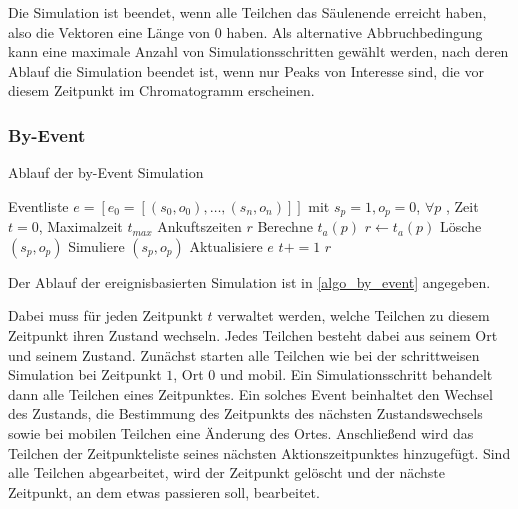 Die Simulation ist beendet, wenn alle Teilchen das Säulenende erreicht haben, also die Vektoren eine Länge von $0$ haben. 
Als alternative Abbruchbedingung kann eine maximale Anzahl von Simulationsschritten gewählt werden, nach deren Ablauf die Simulation beendet ist, wenn nur Peaks von Interesse sind, die vor diesem Zeitpunkt im Chromatogramm erscheinen.



\subsubsection{By-Event}

\begin{algorithm}
\caption{Ablauf der by-Event Simulation}
\label{algo_by_event}
\begin{algorithmic}
\REQUIRE Eventliste $e= [e_0 = [(s_0, o_0), \ldots, (s_n, o_n)]]$ mit $s_p = 1, o_p = 0$, $\forall p$ , Zeit $t=0$, Maximalzeit $t_{max}$
\ENSURE Ankuftszeiten $r$
\STATE Berechne $t_a(p)$ 
\STATE $r \leftarrow t_a(p)$
\STATE Lösche $(s_p, o_p)$
\ENDIF
\STATE Simuliere $(s_p, o_p)$
\STATE Aktualisiere $e$
\ENDFOR
\STATE $t+=1$
\ENDWHILE
\RETURN $r$
\end{algorithmic}
\end{algorithm}

Der Ablauf der ereignisbasierten Simulation ist in \ref{algo_by_event} angegeben.

Dabei muss für jeden Zeitpunkt $t$ verwaltet werden, welche Teilchen zu diesem Zeitpunkt ihren Zustand wechseln. Jedes Teilchen besteht dabei aus seinem Ort und seinem Zustand. 
Zunächst starten alle Teilchen wie bei der schrittweisen Simulation bei Zeitpunkt $1$, Ort $0$ und mobil.
Ein Simulationsschritt behandelt dann alle Teilchen eines Zeitpunktes. Ein solches Event beinhaltet den Wechsel des Zustands, die Bestimmung des Zeitpunkts des nächsten Zustandswechsels sowie bei mobilen Teilchen eine Änderung des Ortes. Anschließend wird das Teilchen der Zeitpunkteliste seines nächsten Aktionszeitpunktes hinzugefügt. Sind alle Teilchen abgearbeitet, wird der Zeitpunkt gelöscht und der nächste Zeitpunkt, an dem etwas passieren soll, bearbeitet.

